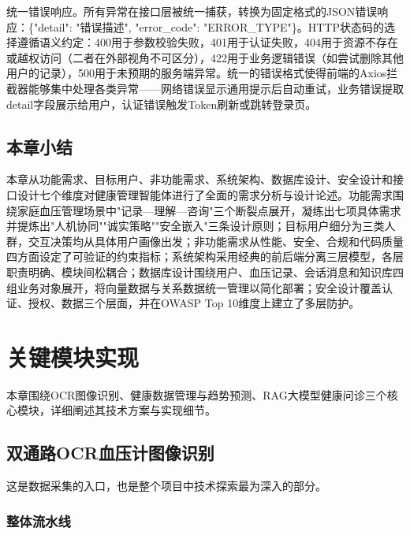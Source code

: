 \documentclass[zihao=-4,a4paper]{ctexart}
\begin{document}
统一错误响应。所有异常在接口层被统一捕获，转换为固定格式的JSON错误响应：\{"detail": "错误描述", "error\_code": "ERROR\_TYPE"\}。HTTP状态码的选择遵循语义约定：400用于参数校验失败，401用于认证失败，404用于资源不存在或越权访问（二者在外部视角不可区分），422用于业务逻辑错误（如尝试删除其他用户的记录），500用于未预期的服务端异常。统一的错误格式使得前端的Axios拦截器能够集中处理各类异常——网络错误显示通用提示后自动重试，业务错误提取detail字段展示给用户，认证错误触发Token刷新或跳转登录页。

\subsection{本章小结}

本章从功能需求、目标用户、非功能需求、系统架构、数据库设计、安全设计和接口设计七个维度对健康管理智能体进行了全面的需求分析与设计论述。功能需求围绕家庭血压管理场景中"记录—理解—咨询"三个断裂点展开，凝练出七项具体需求并提炼出"人机协同""诚实策略""安全嵌入"三条设计原则；目标用户细分为三类人群，交互决策均从具体用户画像出发；非功能需求从性能、安全、合规和代码质量四方面设定了可验证的约束指标；系统架构采用经典的前后端分离三层模型，各层职责明确、模块间松耦合；数据库设计围绕用户、血压记录、会话消息和知识库四组业务对象展开，将向量数据与关系数据统一管理以简化部署；安全设计覆盖认证、授权、数据三个层面，并在OWASP Top 10维度上建立了多层防护。

\newpage
\section{关键模块实现}

本章围绕OCR图像识别、健康数据管理与趋势预测、RAG大模型健康问诊三个核心模块，详细阐述其技术方案与实现细节。

\subsection{双通路OCR血压计图像识别}

这是数据采集的入口，也是整个项目中技术探索最为深入的部分。

\subsubsection{整体流水线}
\end{document}
